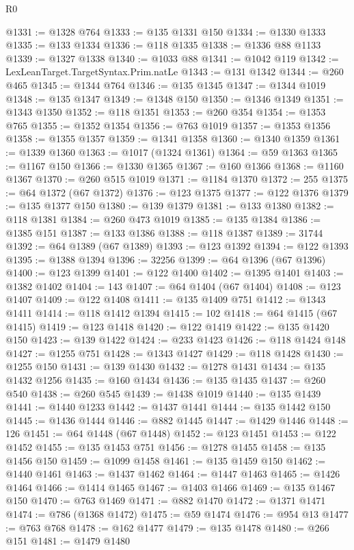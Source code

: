 \begin{lexlean}{R0}
\begin{coremodule}
@1331 := @1328 @764
@1333 := @135 @1331 @150
@1334 := @1330 @1333
@1335 := @133 @1334
@1336 := @118 @1335
@1338 := @1336 @88 @1133
@1339 := @1327 @1338
@1340 := @1033 @88
@1341 := @1042 @119
@1342 := LexLeanTarget.TargetSyntax.Prim.natLe
@1343 := @131 @1342
@1344 := @260 @465
@1345 := @1344 @764
@1346 := @135 @1345
@1347 := @1344 @1019
@1348 := @135 @1347
@1349 := @1348 @150
@1350 := @1346 @1349
@1351 := @1343 @1350
@1352 := @118 @1351
@1353 := @260 @354
@1354 := @1353 @765
@1355 := @1352 @1354
@1356 := @763 @1019
@1357 := @1353 @1356
@1358 := @1355 @1357
@1359 := @1341 @1358
@1360 := @1340 @1359
@1361 := @1339 @1360
@1363 := @1017 (@1324 @1361)
@1364 := @59 @1363
@1365 := @1167 @150
@1366 := @1330 @1365
@1367 := @160 @1366
@1368 := @1160 @1367
@1370 := @260 @515 @1019
@1371 := @1184 @1370
@1372 := 255
@1375 := @64 @1372 (@67 @1372)
@1376 := @123 @1375
@1377 := @122 @1376
@1379 := @135 @1377 @150
@1380 := @139 @1379
@1381 := @133 @1380
@1382 := @118 @1381
@1384 := @260 @473 @1019
@1385 := @135 @1384
@1386 := @1385 @151
@1387 := @133 @1386
@1388 := @118 @1387
@1389 := 31744
@1392 := @64 @1389 (@67 @1389)
@1393 := @123 @1392
@1394 := @122 @1393
@1395 := @1388 @1394
@1396 := 32256
@1399 := @64 @1396 (@67 @1396)
@1400 := @123 @1399
@1401 := @122 @1400
@1402 := @1395 @1401
@1403 := @1382 @1402
@1404 := 143
@1407 := @64 @1404 (@67 @1404)
@1408 := @123 @1407
@1409 := @122 @1408
@1411 := @135 @1409 @751
@1412 := @1343 @1411
@1414 := @118 @1412 @1394
@1415 := 102
@1418 := @64 @1415 (@67 @1415)
@1419 := @123 @1418
@1420 := @122 @1419
@1422 := @135 @1420 @150
@1423 := @139 @1422
@1424 := @233 @1423
@1426 := @118 @1424 @148
@1427 := @1255 @751
@1428 := @1343 @1427
@1429 := @118 @1428
@1430 := @1255 @150
@1431 := @139 @1430
@1432 := @1278 @1431
@1434 := @135 @1432 @1256
@1435 := @160 @1434
@1436 := @135 @1435
@1437 := @260 @540
@1438 := @260 @545
@1439 := @1438 @1019
@1440 := @135 @1439
@1441 := @1440 @1233
@1442 := @1437 @1441
@1444 := @135 @1442 @150
@1445 := @1436 @1444
@1446 := @882 @1445
@1447 := @1429 @1446
@1448 := 126
@1451 := @64 @1448 (@67 @1448)
@1452 := @123 @1451
@1453 := @122 @1452
@1455 := @135 @1453 @751
@1456 := @1278 @1455
@1458 := @135 @1456 @150
@1459 := @1099 @1458
@1461 := @135 @1459 @150
@1462 := @1440 @1461
@1463 := @1437 @1462
@1464 := @1447 @1463
@1465 := @1426 @1464
@1466 := @1414 @1465
@1467 := @1403 @1466
@1469 := @135 @1467 @150
@1470 := @763 @1469
@1471 := @882 @1470
@1472 := @1371 @1471
@1474 := @786 (@1368 @1472)
@1475 := @59 @1474
@1476 := @954 @13
@1477 := @763 @768
@1478 := @162 @1477
@1479 := @135 @1478
@1480 := @266 @151
@1481 := @1479 @1480

\end{coremodule}
\end{lexlean}
